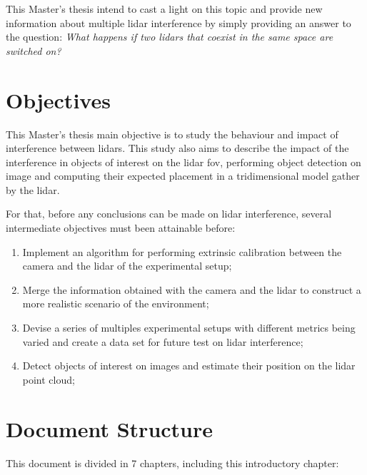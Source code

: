 This Master's thesis intend to cast a light on this topic and provide new information about multiple \ac{lidar} interference by simply providing an answer to the question: \textit{What happens if two \acp{lidar} that coexist in the same space are switched on?} 


\section{Objectives}
\label{sec:introduction:objectives}
This Master's thesis main objective is to study the behaviour and impact of interference between \acp{lidar}. This study also aims to describe the impact of the interference in objects of interest on the \ac{lidar} \acl{fov}, performing object detection on image and computing their expected placement in a tridimensional model gather by the \ac{lidar}.

For that, before any conclusions can be made on \ac{lidar} interference, several intermediate objectives must been attainable before:
\begin{enumerate}
	\item Implement an algorithm for performing extrinsic calibration between the camera and the \ac{lidar} of the experimental setup;
	\item Merge the information obtained with the camera and the \ac{lidar} to construct a more realistic scenario of the environment;
	\item Devise a series of multiples experimental setups with different metrics being varied and create a data set for future test on \ac{lidar} interference;
	\item Detect objects of interest on images and estimate their position on the	\ac{lidar} point cloud;
\end{enumerate}


\section{Document Structure} \label{sec:introduction:structure}
This document is divided in 7 chapters, including this introductory chapter:

